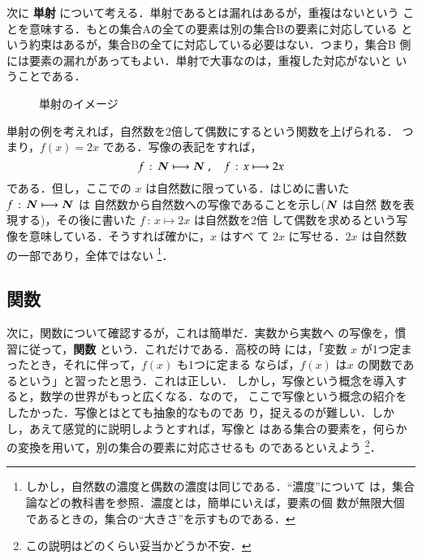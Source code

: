     次に \textbf{単射} について考える．単射であるとは漏れはあるが，重複はないという
    ことを意味する．もとの集合Aの全ての要素は別の集合Bの要素に対応している
    という約束はあるが，集合Bの全てに対応している必要はない．つまり，集合B
    側には要素の漏れがあってもよい．単射で大事なのは，重複した対応がないと
    いうことである．
        \begin{figure}[hbt]
            \begin{center}
                \caption{単射のイメージ}
                \label{fig:tansha1}
            \end{center}
        \end{figure}

    単射の例を考えれば，自然数を2倍して偶数にするという関数を上げられる．
    つまり，$f(x)=2x$ である．写像の表記をすれば，
        \begin{equation*}
            f\,:\,\boldsymbol{N} \longmapsto
            \boldsymbol{N}\;,\quad f\,:\,x \longmapsto  2x
        \end{equation*}
    である．但し，ここでの $x$ は自然数に限っている．はじめに書いた
     $f\,:\,\boldsymbol{N} \longmapsto \boldsymbol{N}$ は
    自然数から自然数への写像であることを示し($\boldsymbol{N}$ は自然
    数を表現する)，その後に書いた $f\,:\,x \longmapsto  2x$ は自然数を2倍
    して偶数を求めるという写像を意味している．そうすれば確かに，$x$ はすべ
    て $2x$ に写せる．$2x$ は自然数の一部であり，全体ではない
        \footnote{
            しかし，自然数の濃度と偶数の濃度は同じである．“濃度”について
            は，集合論などの教科書を参照．濃度とは，簡単にいえば，要素の個
            数が無限大個であるときの，集合の“大きさ”を示すものである．
        }．

\subsection{関数}
    次に，関数について確認するが，これは簡単だ．実数から実数へ
    の写像を，慣習に従って，\textbf{関数} という．これだけである．高校の時
    には，「変数 $x$ が1つ定まったとき，それに伴って，$f(x)$ も1つに定まる
    ならば，$f(x)$ は$x$ の関数であるという」と習ったと思う．これは正しい．
    しかし，写像という概念を導入すると，数学の世界がもっと広くなる．なので，
    ここで写像という概念の紹介をしたかった．写像とはとても抽象的なものであ
    り，捉えるのが難しい．しかし，あえて感覚的に説明しようとすれば，写像と
    はある集合の要素を，何らかの変換を用いて，別の集合の要素に対応させるも
    のであるといえよう
        \footnote{
            この説明はどのくらい妥当かどうか不安．
        }．

